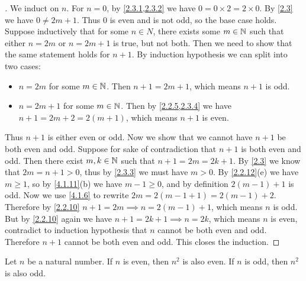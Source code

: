 \begin{proof}[]
  We induct on \(n\).
  For \(n = 0\), by \cref{2.3.1,2.3.2} we have \(0 = 0 \times 2 = 2 \times 0\).
  By \cref{2.3} we have \(0 \neq 2m + 1\).
  Thus \(0\) is even and is not odd, so the base case holds.
  Suppose inductively that for some \(n \in N\), there exists some \(m \in \mathbb{N}\) such that either \(n = 2m\) or \(n = 2m + 1\) is true, but not both.
  Then we need to show that the same statement holds for \(n + 1\).
  By induction hypothesis we can split into two cases:
  \begin{itemize}
    \item \(n = 2m\) for some \(m \in \mathbb{N}\).
          Then \(n + 1 = 2m + 1\), which means \(n + 1\) is odd.
    \item \(n = 2m + 1\) for some \(m \in \mathbb{N}\).
          Then by \cref{2.2.5,2.3.4} we have \(n + 1 = 2m + 2 = 2(m + 1)\), which means \(n + 1\) is even.
  \end{itemize}
  Thus \(n + 1\) is either even or odd.
  Now we show that we cannot have \(n + 1\) be both even and odd.
  Suppose for sake of contradiction that \(n + 1\) is both even and odd.
  Then there exist \(m, k \in \mathbb{N}\) such that \(n + 1 = 2m = 2k + 1\).
  By \cref{2.3} we know that \(2m = n + 1 > 0\), thus by \cref{2.3.3} we must have \(m > 0\).
  By \cref{2.2.12}(e) we have \(m \geq 1\), so by \cref{4.1.11}(b) we have \(m - 1 \geq 0\), and by definition \(2(m - 1) + 1\) is odd.
  Now we use \cref{4.1.6} to rewrite \(2m = 2 (m - 1 + 1) = 2 (m - 1) + 2\).
  Therefore by \cref{2.2.10} \(n + 1 = 2m \implies n = 2 (m - 1) + 1\), which means \(n\) is odd.
  But by \cref{2.2.10} again we have \(n + 1 = 2k + 1 \implies n = 2k\), which means \(n\) is even, contradict to induction hypothesis that \(n\) cannot be both even and odd.
  Therefore \(n + 1\) cannot be both even and odd.
  This closes the induction.
\end{proof}

\begin{ac}\label{ac:4.4.3}
  Let \(n\) be a natural number.
  If \(n\) is even, then \(n^2\) is also even.
  If \(n\) is odd, then \(n^2\) is also odd.
\end{ac}

